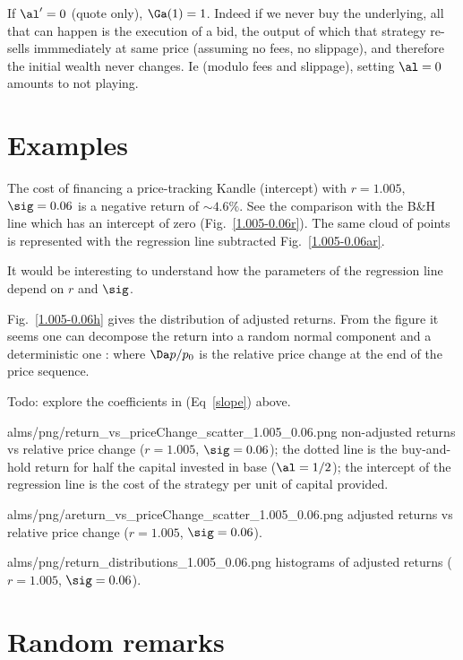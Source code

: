 \documentclass[oneside,12pt]{article}
\begin{document}
If $\al'=0$ (quote only), $\Ga(1) = 1$. Indeed if we never buy the underlying,
all that can happen is the execution of a bid, 
the output of which that strategy re-sells immmediately at same price (assuming no fees, no slippage),
and therefore the initial wealth never changes. Ie (modulo fees and slippage), setting $\al=0$ amounts to not playing.


\section{Examples}
The cost of financing a price-tracking Kandle (intercept) with $r=1.005$, $\sig=0.06$ is a negative return of 
$\sim 4.6\%$. See the comparison with the B\&H line which has an intercept of zero (Fig.~\ref{1.005-0.06r}).
The same cloud of points is represented with the regression line subtracted Fig.~\ref{1.005-0.06ar}.

It would be interesting to understand how the parameters of the regression line depend on $r$ and $\sig$.

Fig.~\ref{1.005-0.06h} gives the distribution of adjusted returns. 
From the figure it seems one can decompose the return into a random normal component
and a deterministic one      :
where $\Da p/p_0$ is the relative price change at the end of the price sequence.

Todo: explore the coefficients in (Eq~\ref{slope}) above.

\IG{420pt}
{alms/png/return_vs_priceChange_scatter_1.005_0.06.png}
{\label{1.005-0.06r} non-adjusted returns vs relative price change ($r=1.005$, $\sig=0.06$); the dotted line is the buy-and-hold
return for half the capital invested in base ($\al=1/2$); the intercept of the regression line 
is the cost of the strategy per unit of capital provided.}

\IG{420pt}
{alms/png/areturn_vs_priceChange_scatter_1.005_0.06.png}
{\label{1.005-0.06ar} adjusted returns vs relative price change ($r=1.005$, $\sig=0.06$).}

\IG{420pt}
{alms/png/return_distributions_1.005_0.06.png}
{\label{1.005-0.06h} histograms of adjusted returns ($r=1.005$, $\sig=0.06$).}

\section{Random remarks}
\end{document}
